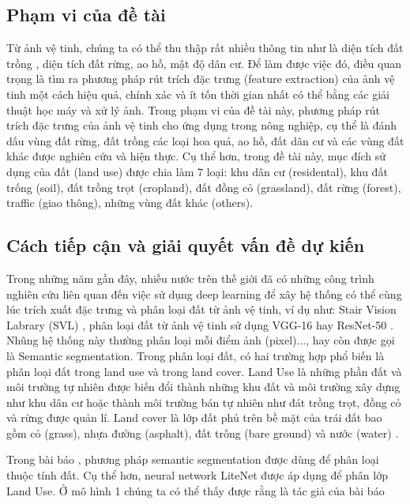 \documentclass{article}[14pt]
\begin{document}
{		\subsection{Phạm vi của đề tài}
		
		Từ ảnh vệ tinh, chúng ta có thể thu thập rất nhiều thông tin như là diện tích đất trồng , diện tích đất rừng, ao hồ, mật độ dân cư. Để làm được việc đó, điều quan trọng là tìm ra phương pháp rút trích đặc trưng (feature extraction) của ảnh vệ tinh một cách hiệu quả, chính xác và ít tốn thời gian nhất có thể bằng các giải thuật học máy và xử lý ảnh. Trong phạm vi của đề tài này, phương pháp rút trích đặc trưng của ảnh vệ tinh cho ứng dụng trong nông nghiệp, cụ thể là đánh dấu vùng đất rừng, đất trồng các loại hoa quả, ao hồ, đất dân cư và các vùng đất khác được nghiên cứu và hiện thực. Cụ thể hơn, trong đề tài này, mục đích sử dụng của đất (land use) được chia làm 7 loại: khu dân cư (residental), khu đất trống (soil), đất trồng trọt (cropland), đất đồng cỏ (grassland), đất rừng (forest), traffic (giao thông), những vùng đất khác (others).
		
		\subsection{Cách tiếp cận và giải quyết vấn đề dự kiến}
		
		Trong những năm gần đây, nhiều nước trên thế giới đã có những công trình nghiên cứu liên quan đến việc sử dụng deep learning để xây hệ thống có thể cùng lúc trích xuất đặc trưng và phân loại đất từ ảnh vệ tinh, ví dụ như:  Stair Vision Labrary (SVL) \cite{svl}, phân loại đất từ ảnh vệ tinh sử dụng VGG-16 hay ResNet-50 \cite{resandvgg}. Nhũng hệ thống này thường phân loại mỗi điểm ảnh (pixel)..., hay còn được gọi là Semantic segmentation. Trong phân loại đất, có hai trường hợp phổ biến là phân loại đất trong land use và trong land cover. Land Use là những phần đất và môi trường tự nhiên được biến đổi thành những khu đất và môi trường xây dựng như khu dân cư hoặc thành môi trường bán tự nhiên như đát trồng trọt, đồng cỏ và rừng được quản lí\cite{landuse}. Land cover là lớp đất phủ trên bề mặt của trái đất bao gồm cỏ (grass), nhựa đường (asphalt), đất trống (bare ground) và nước (water) \cite{landcover}.
		
		Trong bài báo \cite{mainpaper}, phương pháp semantic segmentation được dùng để phân loại thuộc tính đất. Cụ thể hơn, neural network LiteNet được áp dụng để phân lớp Land Use. Ở mô hình 1 chúng ta có thể thấy được rằng là tác giả của bài báo \cite{litenet}
		
}
\end{document}
